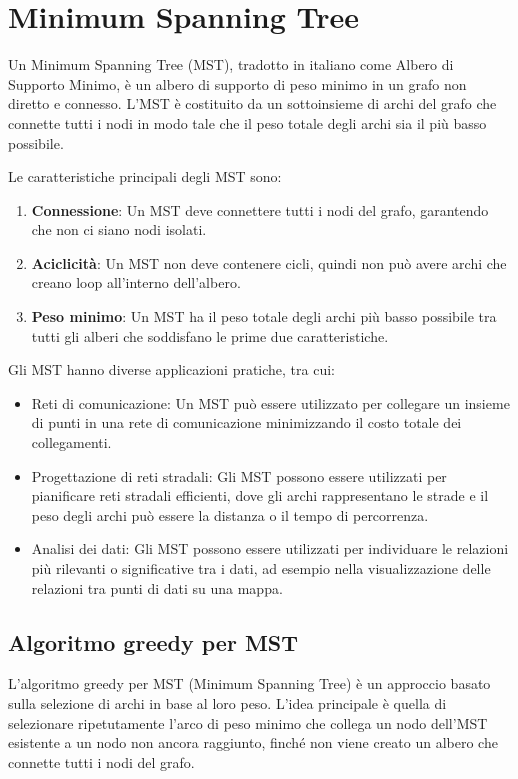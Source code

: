 \chapter{Minimum Spanning Tree}

Un Minimum Spanning Tree (MST), tradotto in italiano come Albero di Supporto Minimo, è un albero di supporto di peso minimo in un grafo non diretto e connesso. L'MST è costituito da un sottoinsieme di archi del grafo che connette tutti i nodi in modo tale che il peso totale degli archi sia il più basso possibile.

Le caratteristiche principali degli MST sono:

\begin{enumerate}
    \item \textbf{Connessione}: Un MST deve connettere tutti i nodi del grafo, garantendo che non ci siano nodi isolati.
    \item \textbf{Aciclicità}: Un MST non deve contenere cicli, quindi non può avere archi che creano loop all'interno dell'albero.
    \item \textbf{Peso minimo}: Un MST ha il peso totale degli archi più basso possibile tra tutti gli alberi che soddisfano le prime due caratteristiche.
\end{enumerate}

Gli MST hanno diverse applicazioni pratiche, tra cui:

\begin{itemize}
    \item Reti di comunicazione: Un MST può essere utilizzato per collegare un insieme di punti in una rete di comunicazione minimizzando il costo totale dei collegamenti.
    \item Progettazione di reti stradali: Gli MST possono essere utilizzati per pianificare reti stradali efficienti, dove gli archi rappresentano le strade e il peso degli archi può essere la distanza o il tempo di percorrenza.
    \item Analisi dei dati: Gli MST possono essere utilizzati per individuare le relazioni più rilevanti o significative tra i dati, ad esempio nella visualizzazione delle relazioni tra punti di dati su una mappa.
\end{itemize}


\section{Algoritmo greedy per MST}
L'algoritmo greedy per MST (Minimum Spanning Tree) è un approccio basato sulla selezione di archi in base al loro peso. L'idea principale è quella di selezionare ripetutamente l'arco di peso minimo che collega un nodo dell'MST esistente a un nodo non ancora raggiunto, finché non viene creato un albero che connette tutti i nodi del grafo.



